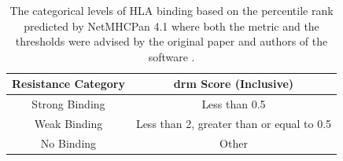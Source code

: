\begin{table}[h]
    \centering %
    \begin{tabular}{||c|c||}
        \hline
        Resistance Category & \Ac{drm} Score (Inclusive) \\
        \hline
        \hline
        Strong Binding & Less than 0.5 \\
        \hline
        Weak Binding & Less than 2, greater than or equal to 0.5 \\
        \hline
        No Binding & Other \\
        \hline
    \end{tabular}
    \caption{The categorical levels of HLA binding based on the percentile rank predicted by NetMHCPan 4.1 where both the metric and the thresholds were advised by the original paper and authors of the software \cite{reynissonNetMHCpan4NetMHCIIpan4Improved2020}.}
    \label{table:elrankpercentile_categorizations}
\end{table}